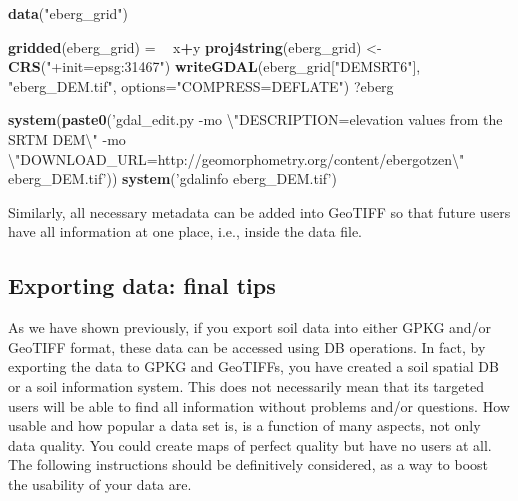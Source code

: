 \documentclass[10pt,b5paper,]{book}
\newenvironment{Shaded}{\begin{snugshade}}{\end{snugshade}}
\newcommand{\CharTok}[1]{\textcolor[rgb]{0.31,0.60,0.02}{#1}}
\newcommand{\DataTypeTok}[1]{\textcolor[rgb]{0.13,0.29,0.53}{#1}}
\newcommand{\ErrorTok}[1]{\textcolor[rgb]{0.64,0.00,0.00}{\textbf{#1}}}
\newcommand{\KeywordTok}[1]{\textcolor[rgb]{0.13,0.29,0.53}{\textbf{#1}}}
\newcommand{\NormalTok}[1]{#1}
\newcommand{\OperatorTok}[1]{\textcolor[rgb]{0.81,0.36,0.00}{\textbf{#1}}}
\newcommand{\StringTok}[1]{\textcolor[rgb]{0.31,0.60,0.02}{#1}}
\theoremstyle{definition}
\theoremstyle{definition}
\theoremstyle{definition}
\theoremstyle{remark}
\begin{document}
\begin{Shaded}
\begin{Highlighting}[]
\KeywordTok{data}\NormalTok{(}\StringTok{"eberg_grid"}\NormalTok{)}

\KeywordTok{gridded}\NormalTok{(eberg_grid) =}\StringTok{ }\ErrorTok{~}\StringTok{ }\NormalTok{x}\OperatorTok{+}\NormalTok{y}
\KeywordTok{proj4string}\NormalTok{(eberg_grid) <-}\StringTok{ }\KeywordTok{CRS}\NormalTok{(}\StringTok{"+init=epsg:31467"}\NormalTok{)}
\KeywordTok{writeGDAL}\NormalTok{(eberg_grid[}\StringTok{"DEMSRT6"}\NormalTok{], }\StringTok{"eberg_DEM.tif"}\NormalTok{, }
            \DataTypeTok{options=}\StringTok{"COMPRESS=DEFLATE"}\NormalTok{)}
\NormalTok{?eberg}

\KeywordTok{system}\NormalTok{(}\KeywordTok{paste0}\NormalTok{(}\StringTok{'gdal_edit.py }
\StringTok{-mo }\CharTok{\textbackslash{}"}\StringTok{DESCRIPTION=elevation values from the SRTM DEM}\CharTok{\textbackslash{}"}\StringTok{ }
\StringTok{-mo }\CharTok{\textbackslash{}"}\StringTok{DOWNLOAD_URL=http://geomorphometry.org/content/ebergotzen}\CharTok{\textbackslash{}"}
\StringTok{eberg_DEM.tif'}\NormalTok{))}
\KeywordTok{system}\NormalTok{(}\StringTok{'gdalinfo eberg_DEM.tif'}\NormalTok{)}
\end{Highlighting}
\end{Shaded}

Similarly, all necessary metadata can be added into GeoTIFF so that
future users have all information at one place, i.e., inside the data
file.

\hypertarget{exporting-data-final-tips}{%
\subsection{Exporting data: final
tips}\label{exporting-data-final-tips}}

As we have shown previously, if you export soil data into either GPKG
and/or GeoTIFF format, these data can be accessed using DB operations.
In fact, by exporting the data to GPKG and GeoTIFFs, you have created a
soil spatial DB or a soil information system. This does not necessarily
mean that its targeted users will be able to find all information
without problems and/or questions. How usable and how popular a data set
is, is a function of many aspects, not only data quality. You could
create maps of perfect quality but have no users at all. \textbar{}The
following instructions should be definitively considered, as a way to
boost the usability of your data are.
\end{document}
